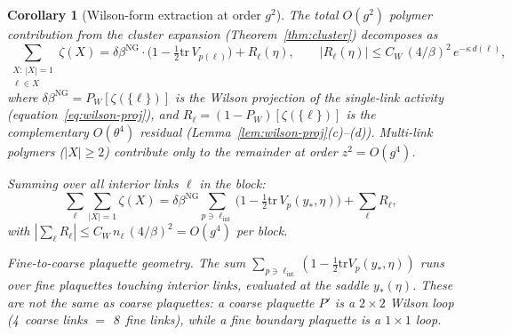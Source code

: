 \documentclass[11pt]{article}
\newtheorem{corollary}[theorem]{Corollary}
\theoremstyle{definition}
\newcommand{\tr}{\mathrm{tr}}
\begin{document}
\begin{corollary}[Wilson-form extraction at order $g^2$]%
\label{cor:wilson-extraction}
The total $O(g^2)$ polymer contribution from the cluster expansion
(Theorem~\ref{thm:cluster}) decomposes as
\begin{equation}\label{eq:wilson-extract}
\sum_{\substack{X:\,|X|=1\\\ell\in X}}\zeta(X)
=\delta\beta^{\mathrm{NG}}\cdot
\bigl(1-\tfrac{1}{2}\tr\,V_{p(\ell)}\bigr)
+R_\ell(\eta),
\qquad
|R_\ell(\eta)|\le C_W\,(4/\beta)^2\,e^{-\kappa\,d(\ell)},
\end{equation}
where $\delta\beta^{\mathrm{NG}}=P_W[\zeta(\{\ell\})]$ is the
Wilson projection of the single-link activity
(equation~\eqref{eq:wilson-proj}), and
$R_\ell=(1-P_W)[\zeta(\{\ell\})]$ is the complementary
$O(\theta^4)$ residual (Lemma~\ref{lem:wilson-proj}(c)--(d)).
Multi-link polymers ($|X|\ge 2$) contribute only to the
remainder at order $z^2=O(g^4)$.

Summing over all interior links $\ell$ in the block:
\begin{equation}
\sum_\ell\sum_{|X|=1}\zeta(X)
=\delta\beta^{\mathrm{NG}}\sum_{p\ni\ell_{\mathrm{int}}}
\bigl(1-\tfrac{1}{2}\tr\,V_p(y_*,\eta)\bigr)
+\sum_\ell R_\ell,
\end{equation}
with $|\sum_\ell R_\ell|\le C_W\,n_\ell\,(4/\beta)^2=O(g^4)$
per block.

\emph{Fine-to-coarse plaquette geometry.}
The sum $\sum_{p\ni\ell_{\mathrm{int}}}(1-\frac{1}{2}\tr V_p
(y_*,\eta))$ runs over \emph{fine} plaquettes touching
interior links, evaluated at the saddle $y_*(\eta)$.
These are not the same as coarse plaquettes:
a coarse plaquette $P'$ is a $2\times 2$ Wilson loop
(4~coarse links $=$ 8~fine links), while a fine boundary
plaquette is a $1\times 1$ loop.


\end{corollary}
\end{document}
